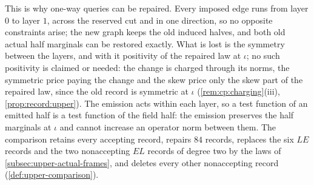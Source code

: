 This is why one-way queries can be repaired. Every imposed edge runs from
layer $0$ to layer $1$, across the reserved cut and in one direction, so no
opposite constraints arise; the new graph keeps the old induced halves, and
both old actual half marginals can be restored exactly. What is lost is the
symmetry between the layers, and with it positivity of the
repaired law at $\iota$; no such positivity is claimed or needed: the change is charged through its
norms, the symmetric price paying the change and the skew price only the skew
part of the repaired law, since the old record is symmetric at $\iota$
(\cref{rem:cp:charging}(iii), \cref{prop:record:upper}).
The emission acts within each layer, so a test function of an emitted half
is a test function of the field half: the emission preserves the half
marginals at $\iota$ and cannot increase an operator norm between them. The
comparison retains every accepting record, repairs $84$ records, replaces the
six $LE$ records and the two nonaccepting $EL$ records of degree two by the
laws of \cref{subsec:upper-actual-frames}, and deletes every other nonaccepting
record (\cref{def:upper-comparison}).

